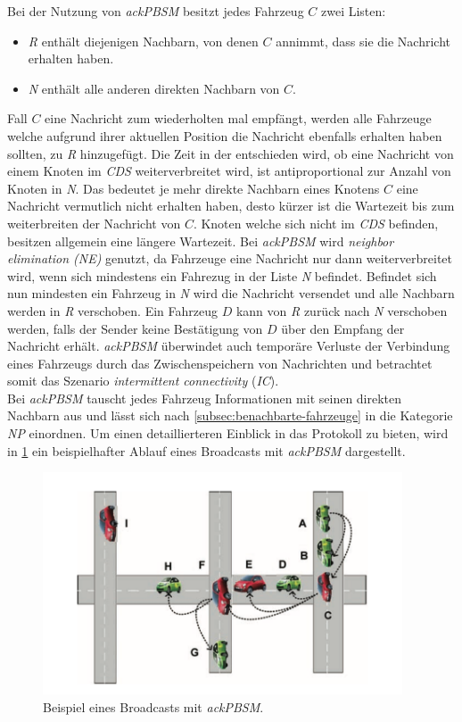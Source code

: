 \documentclass[english,runningheads,a4paper]{llncs}[2018/03/10]
\begin{document}
Bei der Nutzung von \textit{ackPBSM} besitzt jedes Fahrzeug $C$ zwei Listen:
\begin{itemize}
  \item \textit{R} enthält diejenigen Nachbarn, von denen $C$ annimmt, dass sie die Nachricht erhalten haben.
  \item \textit{N} enthält alle anderen direkten Nachbarn von $C$.
\end{itemize}
Fall $C$ eine Nachricht zum wiederholten mal empfängt, werden alle Fahrzeuge welche aufgrund ihrer aktuellen Position die Nachricht ebenfalls erhalten haben sollten, zu \textit{R} hinzugefügt.
Die Zeit in der entschieden wird, ob eine Nachricht von einem Knoten im \textit{CDS} weiterverbreitet wird, ist antiproportional zur Anzahl von Knoten in \textit{N}.
Das bedeutet je mehr direkte Nachbarn eines Knotens $C$ eine Nachricht vermutlich nicht erhalten haben, desto kürzer ist die Wartezeit bis zum weiterbreiten der Nachricht von $C$.
Knoten welche sich nicht im \textit{CDS} befinden, besitzen allgemein eine längere Wartezeit.
Bei \textit{ackPBSM} wird \textit{neighbor elimination (NE)} genutzt, da Fahrzeuge eine Nachricht nur dann weiterverbreitet wird, wenn sich mindestens ein Fahrezug in der Liste \textit{N} befindet.
Befindet sich nun mindesten ein Fahrzeug in \textit{N} wird die Nachricht versendet und alle Nachbarn werden in \textit{R} verschoben.
Ein Fahrzeug $D$ kann von \textit{R} zurück nach \textit{N} verschoben werden, falls der Sender keine Bestätigung von $D$ über den Empfang der Nachricht erhält.
\textit{ackPBSM} überwindet auch temporäre Verluste der Verbindung eines Fahrzeugs durch das Zwischenspeichern von Nachrichten und betrachtet somit das Szenario \textit{intermittent connectivity} (\textit{IC})\cite{conti2013mobile}.\\
Bei \textit{ackPBSM} tauscht jedes Fahrzeug Informationen mit seinen direkten Nachbarn aus und lässt sich nach \ref{subsec:benachbarte-fahrzeuge} in die Kategorie \textit{NP} einordnen.
Um einen detaillierteren Einblick in das Protokoll zu bieten, wird in \ref{fig:ackpbsm-example} ein beispielhafter Ablauf eines Broadcasts mit \textit{ackPBSM} dargestellt.

\begin{figure}[h]
  \centering
  \includegraphics[width=0.95\textwidth]{images/ackpbsm-example.png}
  \caption{Beispiel eines Broadcasts mit \textit{ackPBSM}\cite{conti2013mobile}.}
  \label{fig:ackpbsm-example}
\end{figure}
\end{document}
